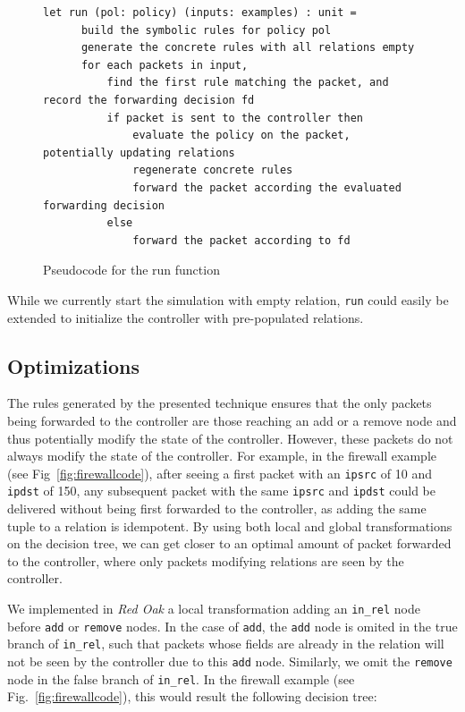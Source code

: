 \documentclass[preprint]{sigplanconf}
\begin{document}
\begin{figure}[ht]
\begin{lstlisting}
let run (pol: policy) (inputs: examples) : unit =
      build the symbolic rules for policy pol
      generate the concrete rules with all relations empty
      for each packets in input,
          find the first rule matching the packet, and record the forwarding decision fd
          if packet is sent to the controller then
              evaluate the policy on the packet, potentially updating relations
              regenerate concrete rules
              forward the packet according the evaluated forwarding decision
          else
              forward the packet according to fd 
\end{lstlisting}

\caption{Pseudocode for the run function}
\label{fig:run-pseudo}
  \end{figure}


While we currently start the simulation with empty relation, \lstinline|run| could easily be extended to initialize the controller with pre-populated relations. 


\subsection*{Optimizations}
The rules generated by the presented technique ensures that the only packets being forwarded to the controller are those reaching an add or a remove node and thus potentially modify the state of the controller. However, these packets do not always modify the state of the controller. For example, in the firewall example (see Fig~\ref{fig:firewallcode}), after seeing a first packet with an \lstinline|ipsrc| of 10 and \lstinline|ipdst| of 150, any subsequent packet with the same \lstinline|ipsrc| and \lstinline|ipdst| could be delivered without being first forwarded to the controller, as adding the same tuple to a relation is idempotent. By using both local and global transformations on the decision tree, we can get closer to an optimal amount of packet forwarded to the controller, where only packets modifying relations are seen by the controller.

We implemented in \textit{Red Oak} a local transformation adding an \lstinline|in_rel| node before \lstinline|add| or \lstinline|remove| nodes. In the case of \lstinline|add|, the \lstinline|add| node is omited in the true branch of \lstinline|in_rel|, such that packets whose fields are already in the relation will not be seen by the controller due to this \lstinline|add| node. Similarly, we omit the \lstinline|remove| node in the false branch of \lstinline|in_rel|. In the firewall example (see Fig.~\ref{fig:firewallcode}), this would result the following decision tree:
\end{document}

